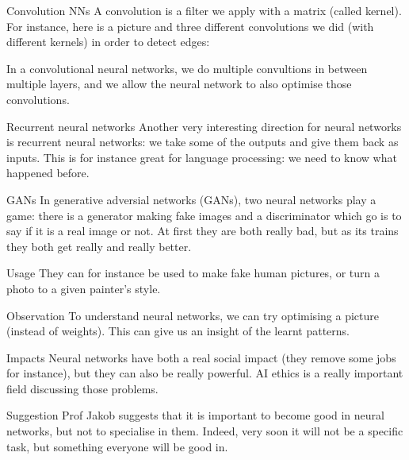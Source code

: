 \documentclass[a4paper]{article}
\begin{document}
\begin{parag}{Convolution NNs}
    A convolution is a filter we apply with a matrix (called kernel). For instance, here is a picture and three different convolutions we did (with different kernels) in order to detect edges:

    In a convolutional neural networks, we do multiple convultions in between multiple layers, and we allow the neural network to also optimise those convolutions.
\end{parag}

\begin{parag}{Recurrent neural networks}
    Another very interesting direction for neural networks is recurrent neural networks: we take some of the outputs and give them back as inputs. This is for instance great for language processing: we need to know what happened before.
\end{parag}

\begin{parag}{GANs}
    In generative adversial networks (GANs), two neural networks play a game: there is a generator making fake images and a discriminator which go is to say if it is a real image or not. At first they are both really bad, but as its trains they both get really and really better.

    \begin{subparag}{Usage}
        They can for instance be used to make fake human pictures, or turn a photo to a given painter's style.
    \end{subparag}
\end{parag}

\begin{parag}{Observation}
    To understand neural networks, we can try optimising a picture (instead of weights). This can give us an insight of the learnt patterns.
\end{parag}

\begin{parag}{Impacts}
    Neural networks have both a real social impact (they remove some jobs for instance), but they can also be really powerful. AI ethics is a really important field discussing those problems.
\end{parag}

\begin{parag}{Suggestion}
    Prof Jakob suggests that it is important to become good in neural networks, but not to specialise in them. Indeed, very soon it will not be a specific task, but something everyone will be good in.
\end{parag}
\end{document}
